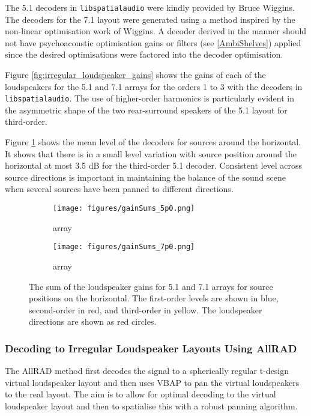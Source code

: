 \documentclass[12pt]{report}
\def\libspataud{\texttt{libspatialaudio}\xspace}
\begin{document}
The 5.1 decoders in \libspataud were kindly provided by Bruce Wiggins. 
The decoders for the 7.1 layout were generated using a method inspired by the non-linear optimisation work of Wiggins.
A decoder derived in the manner should not have psychoacoustic optimisation gains or filters (see \cref{AmbiShelves}) applied since the desired optimisations were factored into the decoder optimisation.

Figure \ref{fig:irregular_loudspeaker_gains} shows the gains of each of the loudspeakers for the 5.1 and 7.1 arrays for the orders 1 to 3 with the decoders in \libspataud.
The use of higher-order harmonics is particularly evident in the asymmetric shape of the two rear-surround speakers of the 5.1 layout for third-order.

Figure \ref{fig:irregular_loudspeaker_levels} shows the mean level of the decoders for sources around the horizontal.
It shows that there is in a small level variation with source position around the horizontal at most 3.5 dB for the third-order 5.1 decoder.
Consistent level across source directions is important in maintaining the balance of the sound scene when several sources have been panned to different directions.

\begin{figure}[tbp]
  \centering
  \begin{subfigure}{0.45\textwidth}
    \texttt{[image: figures/gainSums\_5p0.png]}
    \caption{ array}
  \end{subfigure}
  \hfill
  \begin{subfigure}{0.45\textwidth}
    \texttt{[image: figures/gainSums\_7p0.png]}
    \caption{ array}
  \end{subfigure}
    \caption{The sum of the loudspeaker gains for 5.1 and 7.1 arrays for source positions on the horizontal.
    The first-order levels are shown in blue, second-order in red, and third-order in yellow.
    The loudspeaker directions are shown as red circles.}
  \label{fig:irregular_loudspeaker_levels}
\end{figure}

\subsubsection{Decoding to Irregular Loudspeaker Layouts Using AllRAD}

The AllRAD method \cite{Zotter2012a} first decodes the signal to a spherically regular t-design virtual loudspeaker layout and then uses VBAP \cite{Pulkki1997} to pan the virtual loudspeakers to the real layout.
The aim is to allow for optimal decoding to the virtual loudspeaker layout and then to spatialise this with a robust panning algorithm.
\end{document}
